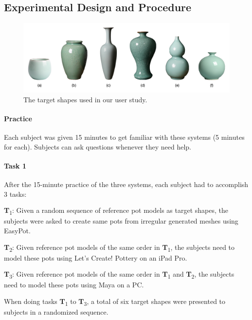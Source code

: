 \documentclass{svjour3}                     %
\begin{document}
\subsection{Experimental Design and Procedure}
\label{sec:6.3}

\begin{figure}
\includegraphics[width=\textwidth]{fig12}
\caption{The target shapes used in our user study.}
\label{fig:target}
\end{figure}

\paragraph{Practice} Each subject was given 15 minutes to get familiar with these systems (5 minutes for each). Subjects can ask questions whenever they need help.

\paragraph{Task 1} After the 15-minute practice of the three systems, each subject had to accomplish 3 tasks:

\textbf{T}\textsubscript{1}: Given a random sequence of reference pot models as target shapes, the subjects were asked to create same pots from irregular generated meshes using EasyPot. 

\textbf{T}\textsubscript{2}: Given reference pot models of the same order in \textbf{T}\textsubscript{1}, the subjects need to model these pots using Let's Create! Pottery on an iPad Pro.

\textbf{T}\textsubscript{3}: Given reference pot models of the same order in \textbf{T}\textsubscript{1} and \textbf{T}\textsubscript{2}, the subjects need to model these pots using Maya on a PC.


When doing tasks \textbf{T}\textsubscript{1} to \textbf{T}\textsubscript{3}, a total of six target shapes were presented to subjects in a randomized sequence.

\end{document}
